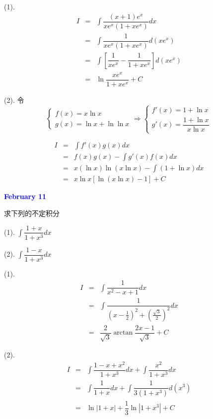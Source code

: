 \begin{solution}

	(1). 
	\begin{eqnarray*}
		I & = & \int \dfrac{(x+1)e^{x}}{xe^{x}(1+xe^{x})}dx\\
		  & = & \int \dfrac{1}{xe^{x}(1+xe^{x})}d(xe^{x})\\
		  & = & \int \left[\dfrac{1}{xe^{x}}-\dfrac{1}{1+xe^{x}}\right]d(xe^{x})\\
		  & = & \ln \dfrac{xe^{x}}{1+xe^{x}} +C
	\end{eqnarray*}

	(2). 令 
	$$\begin{cases}
		f(x) = x\ln x \\ 
		g(x) = \ln x+\ln \ln x
	\end{cases}\Rightarrow 
	\begin{cases} 
		f'(x) = 1+\ln x\\
		g'(x) = \dfrac{1+\ln x}{x\ln x}
	\end{cases}$$
	
	\begin{eqnarray*}
		I & = & \int f'(x)g(x)dx\\
		  & = & f(x)g(x) - \int g'(x)f(x)dx\\
		  & = & x(\ln x)\ln(x\ln x) - \int (1+\ln x)dx\\
		  & = & x\ln x\left[\ln(x\ln x) - 1 \right] + C
	\end{eqnarray*}
\end{solution}

\textcolor{blue}{\textbf{February 11}}
\begin{example}[][Exam: 28.2.7]
	求下列的不定积分

(1). $\displaystyle{\int \dfrac{1+x}{1+x^{3}}dx}$

(2). $\displaystyle{\int \dfrac{1-x}{1+x^{3}}dx}$
\end{example}

\begin{solution}

	(1). 
	\begin{eqnarray*}
		I & = & \int \dfrac{1}{x^{2}-x+1}dx\\
		  & = & \int \dfrac{1}{(x-\frac{1}{2})^{2}+(\frac{\sqrt{3}}{2})^{2}}dx\\
		  & = & \dfrac{2}{\sqrt{3}}\arctan \dfrac{2x-1}{\sqrt{3}} +C
	\end{eqnarray*}

	(2). 
	\begin{eqnarray*}
		I & = & \int\dfrac{1-x+x^{2}}{1+x^{3}}dx + \int\dfrac{x^{2}}{1+x^{3}}dx\\
		  & = & \int\dfrac{1}{1+x}dx + \int\dfrac{1}{3(1+x^{3})}d(x^{3})\\
		  & = & \ln |1+x| + \dfrac{1}{3}\ln|1+x^{3}| + C
	\end{eqnarray*}
\end{solution}

